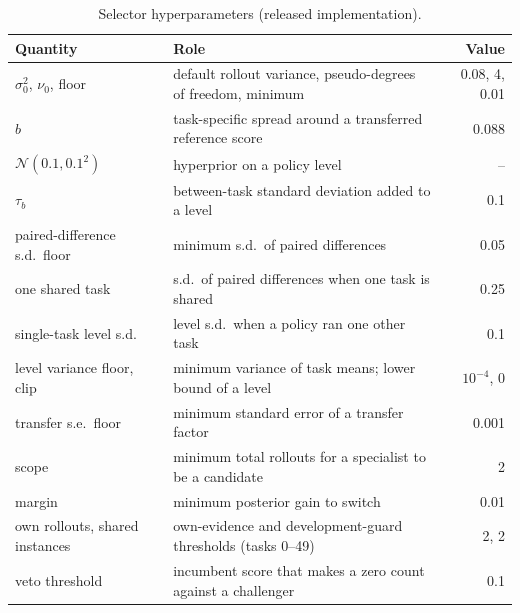 \documentclass[10pt]{article}
\begin{document}
\begin{table}[t]
\centering\small
\caption{Selector hyperparameters (released implementation).}
\label{tab:hyper}
\begin{tabular}{@{}llr@{}}
\toprule
Quantity & Role & Value \\
\midrule
$\sigma_0^2$, $\nu_0$, floor & default rollout variance, pseudo-degrees of freedom, minimum & 0.08, 4, 0.01 \\
$b$ & task-specific spread around a transferred reference score & 0.088 \\
$\mathcal N(0.1, 0.1^2)$ & hyperprior on a policy level & -- \\
$\tau_b$ & between-task standard deviation added to a level & 0.1 \\
paired-difference s.d.\ floor & minimum s.d.\ of paired differences & 0.05 \\
one shared task & s.d.\ of paired differences when one task is shared & 0.25 \\
single-task level s.d. & level s.d.\ when a policy ran one other task & 0.1 \\
level variance floor, clip & minimum variance of task means; lower bound of a level & $10^{-4}$, 0 \\
transfer s.e.\ floor & minimum standard error of a transfer factor & 0.001 \\
scope & minimum total rollouts for a specialist to be a candidate & 2 \\
margin & minimum posterior gain to switch & 0.01 \\
own rollouts, shared instances & own-evidence and development-guard thresholds (tasks 0--49) & 2, 2 \\
veto threshold & incumbent score that makes a zero count against a challenger & 0.1 \\
\bottomrule
\end{tabular}
\end{table}
\end{document}
